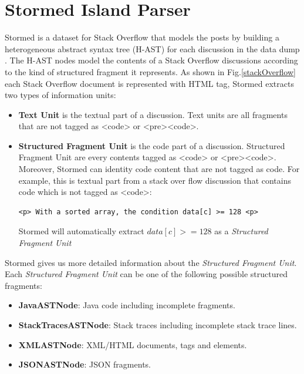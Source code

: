 \documentclass[12pt,mscthesis]{usiinfthesis}
\begin{document}
	\section*{Stormed Island Parser}
	
	 Stormed is a dataset for Stack Overflow that models the posts by building a heterogeneous abstract syntax tree (H-AST) for each discussion in the data dump \cite{Ponz2015a}.  The H-AST nodes model the contents of a Stack Overflow discussions according to the kind of structured fragment it represents. As shown in Fig.\cref{stackOverflow} each Stack Overflow document is represented with HTML tag, Stormed extracts two types of information units:
	 	 \begin{itemize}
		\item \textbf{Text Unit} is the textual part of a discussion. Text units are all fragments that are not tagged as <code> or <pre><code>.	
		\item \textbf{Structured Fragment Unit} is the code part of a discussion. Structured Fragment Unit are every contents tagged as <code> or <pre><code>. Moreover, Stormed can identity code content that are not tagged as code. For example, this is textual part from a stack over flow discussion that contains code which is not tagged as <code>: \begin{verbatim}<p> With a sorted array, the condition data[c] >= 128 <p> \end{verbatim} Stormed will automatically extract $data[c] >= 128$ as a \emph{Structured Fragment Unit}
	 \end{itemize}
	 Stormed gives us more detailed information about the \textit{Structured Fragment Unit}.\\
	 Each \textit{Structured Fragment Unit} can be one of the following possible structured fragments:
	 \begin{itemize}
	 \item \textbf{JavaASTNode}: Java code including incomplete fragments.
	 \item \textbf{StackTracesASTNode}: Stack traces including incomplete stack trace lines.
	 \item \textbf{XMLASTNode}: XML/HTML documents, tags and elements.
	 \item \textbf{JSONASTNode}: JSON fragments.
	 \end{itemize}
\end{document}
